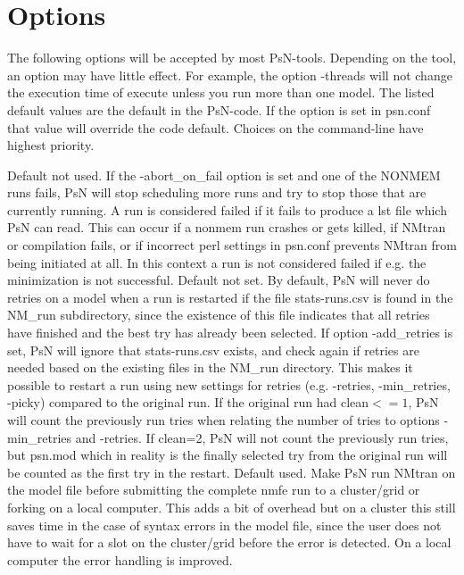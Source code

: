 \section{Options}
The following options will be accepted by most PsN-tools. Depending on the tool, an option may have little effect. For example, the option -threads will not change the execution time of execute unless you run more than one model. The listed default values are the default in the PsN-code. If the option is set in psn.conf that value will override the code default. Choices on the command-line have highest priority.
\begin{optionlist}
Default not used. If the -abort\_on\_fail option is set and one of the NONMEM runs fails, PsN will stop scheduling more runs and try to stop those that are currently running. A run is considered failed if it fails to produce a lst file which PsN can read. This can occur if a nonmem run crashes or gets killed, if NMtran or compilation fails, or if incorrect perl settings in psn.conf prevents NMtran from being initiated at all. In this context a run is not considered failed if e.g. the minimization is not successful.  
\nextopt
{}
Default not set. By default, PsN will never do retries on a model when a run is restarted if the file stats-runs.csv is found in the NM\_run subdirectory, since the existence of this file indicates that all retries have finished and the best try has already been selected. If option -add\_retries is set, PsN will ignore that stats-runs.csv exists, and check again if retries are needed based on the existing files in the NM\_run directory. This makes it possible to restart a run using new settings for retries (e.g. -retries, -min\_retries, -picky) compared to the original run. If the original run had clean$<=1$, PsN will count the previously run tries when relating the number of tries to options -min\_retries and -retries. If clean=2, PsN will not count the previously run tries, but psn.mod which in reality is the finally selected try from the original run will be counted as the first try in the restart.  
\nextopt
{}
Default used. Make PsN run NMtran on the model file before submitting the complete nmfe run to a cluster/grid or forking on a local computer. This adds a bit of overhead but on a cluster this still saves time in the case of syntax errors in the model file, since the user does not have to wait for a slot on the cluster/grid before the error is detected. On a local computer the error handling is improved.


\end{optionlist}
